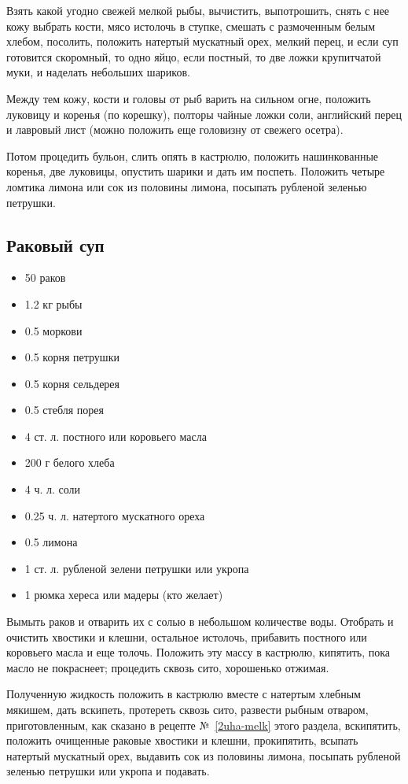 Взять какой угодно свежей мелкой рыбы, вычистить, выпотрошить, снять с нее кожу выбрать кости, мясо истолочь в ступке, смешать с размоченным белым хлебом, посолить, положить натертый мускатный орех, мелкий перец, и если суп готовится скоромный, то одно яйцо, если постный, то две ложки крупитчатой муки, и наделать небольших шариков.

Между тем кожу, кости и головы от рыб варить на сильном огне, положить луковицу и коренья (по корешку), полторы чайные ложки соли, английский перец и лавровый лист (можно положить еще головизну от свежего осетра).

Потом процедить бульон, слить опять в кастрюлю, положить нашинкованные коренья, две луковицы, опустить шарики и дать им поспеть. Положить четыре ломтика лимона или сок из половины лимона, посыпать рубленой зеленью петрушки.

\subsection{Раковый суп}\label{21rak-sup}

\begin{itemize}
	\item 50 раков
    \item 1.2 кг рыбы 
    \item 0.5 моркови 
    \item 0.5 корня петрушки
    \item 0.5 корня сельдерея
    \item 0.5 стебля порея
    \item 4 ст. л. постного или коровьего масла
    \item 200 г белого хлеба
    \item 4 ч. л. соли
    \item 0.25 ч. л. натертого мускатного ореха
    \item 0.5 лимона
    \item 1 ст. л. рубленой зелени петрушки или укропа 
    \item 1 рюмка хереса или мадеры (кто желает)
\end{itemize}

Вымыть раков и отварить их с солью в небольшом количестве воды. Отобрать и очистить хвостики и клешни, остальное истолочь, прибавить постного или коровьего масла и еще толочь. Положить эту массу в кастрюлю, кипятить, пока масло не покраснеет; процедить сквозь сито, хорошенько отжимая.

Полученную жидкость положить в кастрюлю вместе с натертым хлебным мякишем, дать вскипеть, протереть сквозь сито, развести рыбным отваром, приготовленным, как сказано в рецепте №~\ref{2uha-melk} этого раздела, вскипятить, положить очищенные раковые хвостики и клешни, прокипятить, всыпать натертый мускатный орех, выдавить сок из половины лимона, посыпать рубленой зеленью петрушки или укропа и подавать.

